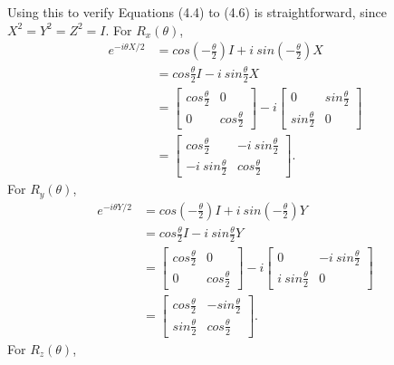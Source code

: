 Using this to verify Equations (4.4) to (4.6) is straightforward,
since $X^2 = Y^2 = Z^2 = I$.
For $R_x(\theta)$,
\begin{align}
    e^{-i \theta X / 2} &= cos( - \frac \theta 2) I + i\ sin( - \frac \theta 2) X \\
    &= cos \frac \theta 2 I - i\ sin \frac \theta 2 X \\
    &= \left[ \begin{matrix} cos \frac \theta 2 & 0 \\ 0 & cos \frac \theta 2 \end{matrix} \right] - i
        \left[ \begin{matrix} 0 & sin \frac \theta 2 \\ sin \frac \theta 2 & 0 \end{matrix} \right] \\
    &= \left[ \begin{matrix} cos \frac \theta 2 & - i\ sin \frac \theta 2 \\
        - i\ sin \frac \theta 2 & cos \frac \theta 2 \end{matrix} \right].
\end{align}
For $R_y(\theta)$,
\begin{align}
    e^{-i \theta Y / 2} &= cos( - \frac \theta 2) I + i\ sin( - \frac \theta 2) Y \\
    &= cos \frac \theta 2 I - i\ sin \frac \theta 2 Y \\
    &= \left[ \begin{matrix} cos \frac \theta 2 & 0 \\ 0 & cos \frac \theta 2 \end{matrix} \right] - i
        \left[ \begin{matrix} 0 & -i\ sin \frac \theta 2 \\ i\ sin \frac \theta 2 & 0 \end{matrix} \right] \\
    &= \left[ \begin{matrix} cos \frac \theta 2 & - sin \frac \theta 2 \\
        sin \frac \theta 2 & cos \frac \theta 2 \end{matrix} \right].
\end{align}
For $R_z(\theta)$,
